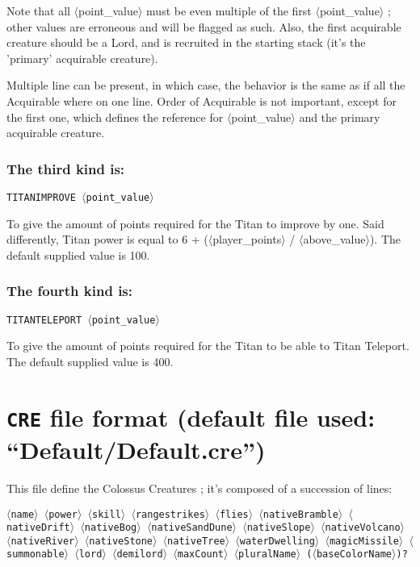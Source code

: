 \documentclass{article}
\begin{document}
Note that all $\langle$point\_value$\rangle$ must be even multiple of the first $\langle$point\_value$\rangle$ ; other values are erroneous and will be flagged as such. Also, the first acquirable creature should be a Lord, and is recruited in the starting stack (it's the 'primary' acquirable creature).

Multiple line can be present, in which case, the behavior is the same as if all the Acquirable where on one line. Order of Acquirable is not important, except for the first one, which defines the reference for $\langle$point\_value$\rangle$ and the primary acquirable creature.

\subsubsection*{The third kind is:}

\texttt{TITANIMPROVE $\langle$point\_value$\rangle$}

To give the amount of points required for the Titan to improve by one. Said differently, Titan power is equal to 6 + ($\langle$player\_points$\rangle$ / $\langle$above\_value$\rangle$). The default supplied value is 100.

\subsubsection*{The fourth kind is:}

\texttt{TITANTELEPORT $\langle$point\_value$\rangle$}

To give the amount of points required for the Titan to be able to Titan Teleport. The default supplied value is 400.

\section{\texttt{CRE} file format (default file used: ``Default/Default.cre'')}
\label{CRE}

This file define the Colossus Creatures ; it's composed of a succession of lines:

\texttt{$\langle$name$\rangle$ $\langle$power$\rangle$ $\langle$skill$\rangle$
$\langle$rangestrikes$\rangle$ $\langle$flies$\rangle$
$\langle$nativeBramble$\rangle$ $\langle$nativeDrift$\rangle$
$\langle$nativeBog$\rangle$     $\langle$nativeSandDune$\rangle$
$\langle$nativeSlope$\rangle$   $\langle$nativeVolcano$\rangle$
$\langle$nativeRiver$\rangle$   $\langle$nativeStone$\rangle$
$\langle$nativeTree$\rangle$
$\langle$waterDwelling$\rangle$ $\langle$magicMissile$\rangle$
$\langle$summonable$\rangle$
$\langle$lord$\rangle$ $\langle$demilord$\rangle$
$\langle$maxCount$\rangle$
$\langle$pluralName$\rangle$
($\langle$baseColorName$\rangle$)?}
\end{document}

